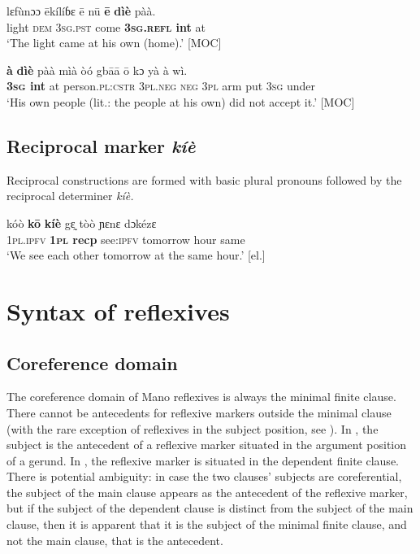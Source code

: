 \documentclass[output=paper]{langscibook}
\begin{document}
 \ea
    \label{ex:Kachaturyan:16} 
    \ea
    \label{ex:Kachaturyan:16a} 
\gll lɛfùnɔɔ  ēkílíɓɛ  ē  nū  \textbf{ē}  \textbf{dìè}  pàà.\\
     light  \textsc{dem}  \textsc{3sg.pst}  come  \textbf{\textsc{3sg.refl}  \textbf{int}}  at\\
\glt ‘The light came at his own (home).’ [MOC] 

    \ex
    \label{ex:Kachaturyan:16b} 
    \gll \textbf{à}  \textbf{dìè}  pàà  mìà  òó  gbāā  ō  kɔ  yà  à  wì.\\
     \textbf{3\textsc{sg}  \textbf{int}  }at  person.\textsc{pl}:\textsc{cstr}  \textsc{3pl.neg}  \textsc{neg}  \textsc{3pl}  arm  put  3\textsc{sg}  under\\
     ‘His own people (lit.: the people at his own) did not accept it.’ [MOC]\\
    \z
\z
 
 \subsection{Reciprocal marker \textit{kíè}}\label{sec:Kachaturyan:4.2}

Reciprocal constructions are formed with basic plural pronouns followed by the reciprocal determiner \textit{kíè.}

\ea
    \label{ex:Kachaturyan:17} 
 \gll kóò  \textbf{kō}  \textbf{kíè}  gɛ̰  tòò  ɲɛnɛ  dɔkézɛ\\
     \textsc{1pl.ipfv}  \textbf{\textsc{1pl}  \textbf{recp}}  see:\textsc{ipfv}  tomorrow  hour  same\\
\glt ‘We see each other tomorrow at the same hour.’ [el.]
\z


 \section{Syntax of reflexives}\label{sec:Kachaturyan:5}


 \subsection{Coreference domain}\label{sec:Kachaturyan:5.1}

The coreference domain of Mano reflexives is always the minimal finite clause. There cannot be antecedents for reflexive markers outside the minimal clause (with the rare exception of reflexives in the subject position, see ). In , the subject is the antecedent of a reflexive marker situated in the argument position of a gerund. In , the reflexive marker is situated in the dependent finite clause. There is potential ambiguity: in case the two clauses’ subjects are coreferential, the subject of the main clause appears as the antecedent of the reflexive marker, but if the subject of the dependent clause is distinct from the subject of the main clause, then it is apparent that it is the subject of the minimal finite clause, and not the main clause, that is the antecedent.
\end{document}
